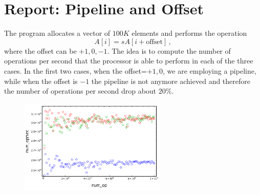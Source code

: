 \documentclass[a4paper,9pt, english]{report}
\theoremstyle{plain}
\theoremstyle{definition}
\theoremstyle{remark}
\begin{document}
\section{Report: Pipeline and Offset}

The program allocates a vector of $100K$ elements and performs the operation
\begin{equation}
A[i] = s A[i + \mbox{offset}]\,,
\end{equation}
where the offset can be $+1,0,-1$. 
The idea is to compute the number of operations per second that the processor is able to perform in each of the three cases. 
In the first two cases, when the offset=$+1,0$, we are employing a pipeline, while when the offset is $-1$ the 
pipeline is not anymore achieved and therefore the number of operations per second drop about $20\%$.

 \begin{figure}
\begin{center}
\includegraphics[width=7cm]{pipeline.pdf}
\end{center}
\caption{}
\label{fig: speedup}
\end{figure}
\end{document}
